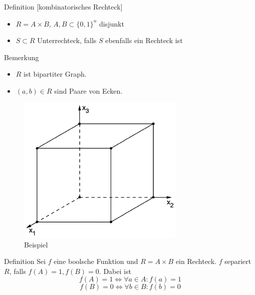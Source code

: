 \begin{frame}
    \begin{block}{Definition [kombinatorisches Rechteck]}
        \begin{itemize}
            \item $R = A \times B$, $A, B \subset \{0, 1\}^n $ disjunkt
            \item $S\subset R$ Unterrechteck, falls $S$ ebenfalls ein Rechteck ist
        \end{itemize}
        
    \end{block}
    
    \begin{block}{Bemerkung}
        \begin{itemize}
            \item $R$ ist bipartiter Graph.
            \item $(a,b) \in R$ sind Paare von Ecken.
        \end{itemize}
    \end{block}
\end{frame}

\begin{frame}
    \begin{figure}
        \centering
        \includegraphics[width=80mm,scale=0.5]{wuerfel.png}
        \caption{Beispiel}
    \end{figure}
\end{frame}

\begin{frame}
    \begin{block}{Definition}
        Sei $f$ eine boolsche Funktion und $R = A \times B$ ein Rechteck. $f$ separiert $R$, falls $f(A) = 1, f(B) = 0$.
        \newline
        \newline
        Dabei ist
        \[ 
            f(A) = 1 \Leftrightarrow \forall a \in A : f(a) = 1
        \] 
        \[
            f(B) = 0 \Leftrightarrow \forall b \in B : f(b) = 0
        \]
    \end{block}
\end{frame}

